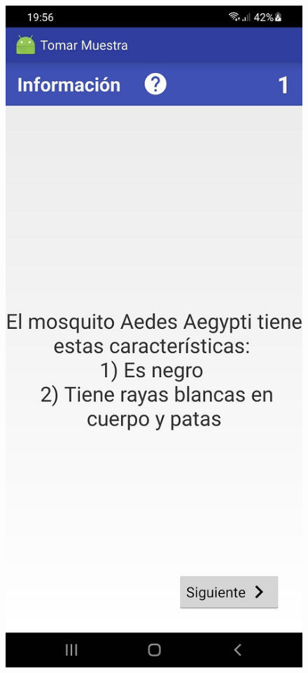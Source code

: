 \begin{figure}[H]
\begin{center}
   \includegraphics[scale=0.3]{05-implementacion/app_generada_ejemplo2.jpg}    
   \end{center}
   \begin{center}

\end{center}
\end{figure}
